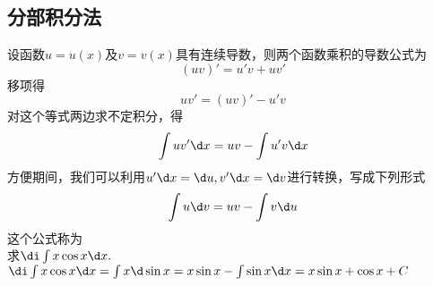 	\subsection{分部积分法}
	设函数$u=u(x)$及$v=v(x)$具有连续导数，则两个函数乘积的导数公式为
	\begin{equation}
		(uv)'=u'v+uv'
	\end{equation} 
移项得
\begin{equation}
	uv'=(uv)'-u'v
	\end{equation}
对这个等式两边求不定积分，得
\begin{equation}
	\int uv'\d x=uv-\int u'v\d x
\end{equation}
方便期间，我们可以利用$u'\d x=\d u,v'\d x=\d v$进行转换，写成下列形式
\begin{equation}
	\int u\d v=uv-\int v\d u
\end{equation}
这个公式称为\\
\vspace{0.5em}
\examples 求$\di\int x\cos x\d x.$\\
\solve $\di\int x\cos x\d x=\int x\d \sin x=x\sin x-\int \sin x\d x=x\sin x+\cos x+C $
